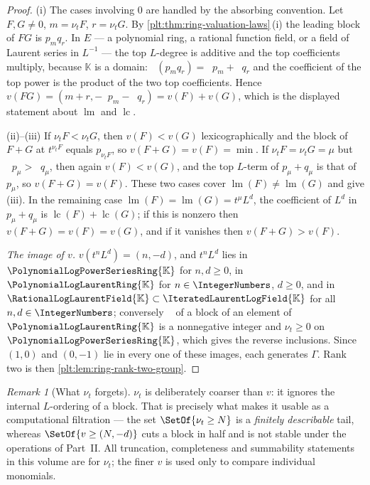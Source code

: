 \documentclass[11pt,oneside]{article}
\theoremstyle{plain}
\theoremstyle{definition}
\theoremstyle{remark}
\newtheorem{remark}[theorem]{Remark}
\newcommand{\K}{\mathbb{K}}
\newcommand{\PLpow}{\PolynomialLogPowerSeriesRing{\K}}   %
\newcommand{\PLlau}{\PolynomialLogLaurentRing{\K}}       %
\newcommand{\PLrat}{\RationalLogLaurentField{\K}}        %
\newcommand{\PLit}{\IteratedLaurentLogField{\K}}         %
\newcommand{\ordt}{\nu_{t}}                              %
\DeclareMathOperator{\lm}{lm}
\DeclareMathOperator{\lc}{lc}
\DeclareMathOperator{\degL}{deg_{L}}
\begin{document}
\begin{proof}
(i)  The cases involving \(0\) are handled by the absorbing convention.  Let
\(F,G\ne0\), \(m=\ordt F\), \(r=\ordt G\).  By
\cref{plt:thm:ring-valuation-laws}\,(i) the leading block of \(FG\) is
\(p_mq_r\).  In \(E\) --- a polynomial ring, a rational function field, or a
field of Laurent series in \(L^{-1}\) --- the top \(L\)-degree is additive and
the top coefficients multiply, because \(\K\) is a domain:
\(\degL(p_mq_r)=\degL p_m+\degL q_r\) and the coefficient of the top power is
the product of the two top coefficients.  Hence
\(v(FG)=(m+r,-\degL p_m-\degL q_r)=v(F)+v(G)\), which is the displayed
statement about \(\lm\) and \(\lc\).

(ii)--(iii)  If \(\ordt F<\ordt G\), then \(v(F)<v(G)\) lexicographically and
the block of \(F+G\) at \(t^{\ordt F}\) equals \(p_{\ordt F}\), so
\(v(F+G)=v(F)=\min\).  If \(\ordt F=\ordt G=\mu\) but
\(\degL p_\mu>\degL q_\mu\), then again \(v(F)<v(G)\), and the top \(L\)-term
of \(p_\mu+q_\mu\) is that of \(p_\mu\), so \(v(F+G)=v(F)\).  These two cases
cover \(\lm(F)\ne\lm(G)\) and give (iii).  In the remaining case
\(\lm(F)=\lm(G)=t^\mu L^{d}\), the coefficient of \(L^d\) in \(p_\mu+q_\mu\)
is \(\lc(F)+\lc(G)\); if this is nonzero then \(v(F+G)=v(F)=v(G)\), and if it
vanishes then \(v(F+G)>v(F)\).

\emph{The image of \(v\).}  \(v(t^nL^{d})=(n,-d)\), and \(t^nL^{d}\) lies in
\(\PLpow\) for \(n,d\ge0\), in \(\PLlau\) for \(n\in\IntegerNumbers\),
\(d\ge0\), and in \(\PLrat\subset\PLit\) for all \(n,d\in\IntegerNumbers\);
conversely \(\degL\) of a block of an element of \(\PLlau\) is a nonnegative
integer and \(\ordt\ge0\) on \(\PLpow\), which gives the reverse inclusions.
Since \((1,0)\) and \((0,-1)\) lie in every one of these images, each
generates \(\Gamma\).  Rank two is then
\cref{plt:lem:ring-rank-two-group}.
\end{proof}

\begin{remark}[What \(\ordt\) forgets]
\label{plt:rmk:lead-coarse}
\(\ordt\) is deliberately coarser than \(v\): it ignores the internal
\(L\)-ordering of a block.  That is precisely what makes it usable as a
computational filtration --- the set \(\SetOf{\ordt\ge N}\) is a
\emph{finitely describable} tail, whereas \(\SetOf{v\ge(N,-d)}\) cuts a block
in half and is not stable under the operations of Part~II.  All truncation,
completeness and summability statements in this volume are for \(\ordt\); the
finer \(v\) is used only to compare individual monomials.
\end{remark}
\end{document}
